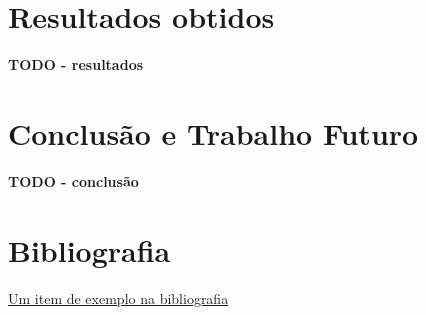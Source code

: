\documentclass[12pt, a4paper]{article}
\begin{document}
\section{Resultados obtidos}

\textbf{\color{red} TODO - resultados}

\section{Conclusão e Trabalho Futuro}

\textbf{\color{red} TODO - conclusão}

\begingroup
\section{Bibliografia}
\renewcommand{\section}[2]{}

\begin{thebibliography}{9}
        \href{https://youtu.be/dQw4w9WgXcQ}{Um item de exemplo na bibliografia}
\end{thebibliography}
\endgroup
\end{document}
